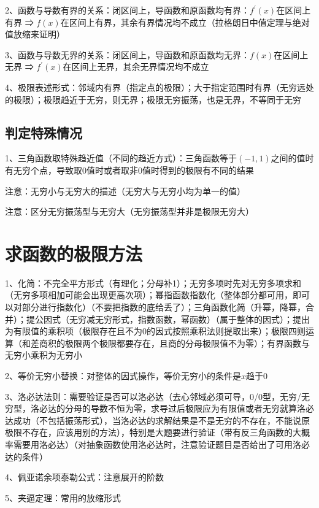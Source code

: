 2、函数与导数有界的关系：闭区间上，导函数和原函数均有界：$f^{\prime}(x)$在区间上有界 ⇒ $f(x)$在区间上有界，其余有界情况均不成立（拉格朗日中值定理与绝对值放缩来证明）

3、函数与导数无界的关系：闭区间上，导函数和原函数均无界：$f(x)$在区间上无界 ⇒ $f^{\prime}(x)$在区间上无界，其余无界情况均不成立

4、极限表述形式：邻域内有界（指定点的极限）；大于指定范围时有界（无穷远处的极限）；极限趋近于无穷，则无界；极限无穷振荡，也是无界，不等同于无穷



\subsection{判定特殊情况}

1、三角函数取特殊趋近值（不同的趋近方式）：三角函数等于$(-1,1)$之间的值时有无穷个点，导致取0值时或者取非0值时得到的极限有不同的结果

注意：无穷小与无穷大的描述（无穷大与无穷小均为单一的值）

注意：区分无穷振荡型与无穷大（无穷振荡型并非是极限无穷大）

\section{求函数的极限方法}

1、化简：不完全平方形式（有理化；分母补1）；无穷多项时先对无穷多项求和（无穷多项相加可能会出现更高次项）；幂指函数指数化（整体部分都可用，即可以对部分进行指数化）（不要把指数的底给丢了）；三角函数化简（升幂，降幂，合并）；提公因式（无穷减无穷形式，指数函数，幂函数）（属于整体的因式）；提出为有限值的乘积项（极限存在且不为0的因式按照乘积法则提取出来）；极限四则运算（和差商积的极限两个极限都要存在，且商的分母极限值不为零）；有界函数与无穷小乘积为无穷小

2、等价无穷小替换：对整体的因式操作，等价无穷小的条件是$x$趋于0

3、洛必达法则：需要验证是否可以洛必达（去心邻域必须可导，0/0型，无穷/无穷型，洛必达的分母的导数不恒为零，求导过后极限应为有限值或者无穷就算洛必达成功（不包括振荡形式），当洛必达的求解结果是不是无穷的不存在，不能说原极限不存在，应该用别的方法），特别是大题要进行验证（带有反三角函数的大概率需要用洛必达）（对抽象函数使用洛必达时，注意验证题目是否给出了可用洛必达的条件）

4、佩亚诺余项泰勒公式：注意展开的阶数

5、夹逼定理：常用的放缩形式

